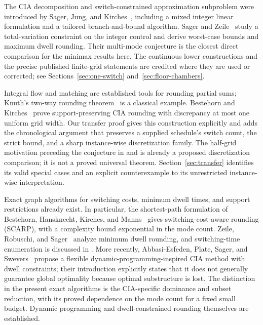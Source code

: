 The CIA decomposition and switch-constrained approximation subproblem were
introduced by Sager, Jung, and Kirches~\cite{sager2011cia}, including a mixed
integer linear formulation and a tailored branch-and-bound algorithm.
Sager and Zeile~\cite{sager-zeile2021} study a total-variation constraint on the
integer control and derive worst-case bounds and maximum dwell rounding.
Their multi-mode conjecture is the closest direct comparison for the minimax
results here. The continuous lower constructions and the precise published
finite-grid statements are credited where they are used or corrected; see
Sections~\ref{sec:one-switch} and~\ref{sec:floor-chambers}.

Integral flow and matching are established tools for rounding partial sums;
Knuth's two-way rounding theorem~\cite{knuth1995} is a classical example.
Bestehorn and Kirches~\cite[Corollary~2.7]{bestehorn2021vanishing} prove
support-preserving CIA rounding with discrepancy at most one uniform grid
width. Our transfer proof gives this construction explicitly and adds the
chronological argument that preserves a supplied schedule's switch count,
the strict bound, and a sharp instance-wise discretization family. The
half-grid motivation preceding the conjecture in
\cite[p.~615]{sager-zeile2021} and \cite[p.~139]{zeile2021thesis} is already a
proposed discretization comparison; it is not a proved universal theorem.
Section~\ref{sec:transfer} identifies its valid special cases and an explicit
counterexample to its unrestricted instance-wise interpretation.

Exact graph algorithms for switching costs, minimum dwell times, and support
restrictions already exist. In particular, the shortest-path formulation of
Bestehorn, Hansknecht, Kirches, and Manns~\cite{bestehorn2021shortest} gives
switching-cost-aware rounding (SCARP), with a complexity bound exponential in
the mode count. Zeile, Robuschi, and Sager~\cite{zeile2021dwell} analyze minimum
dwell rounding, and switching-time enumeration is discussed in
\cite[Section~6.4.3]{zeile2021thesis}. More recently,
Abbasi-Esfeden, Plate, Sager, and Swevers~\cite{abbasi2025} propose a flexible
dynamic-programming-inspired CIA method with dwell constraints; their
introduction explicitly states that it does not generally guarantee global
optimality because optimal substructure is lost. The distinction in the
present exact algorithms is the CIA-specific dominance and subset reduction,
with its proved dependence on the mode count for a fixed small budget.
Dynamic programming and dwell-constrained rounding themselves are established.

